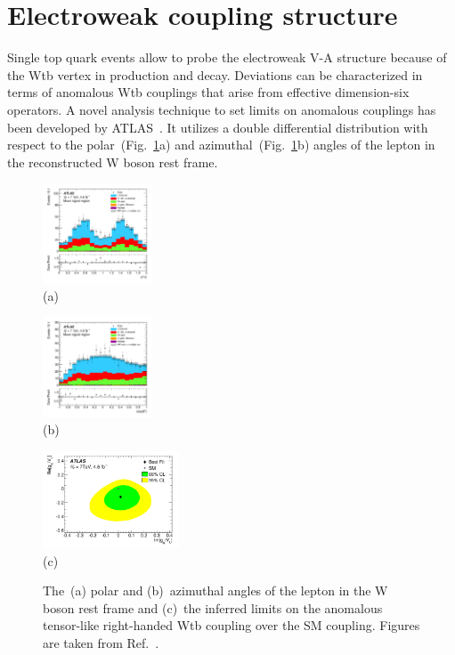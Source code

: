 \documentclass{PoS}
\begin{document}
\section{Electroweak coupling structure}
Single top quark events allow to probe the electroweak V-A structure because of the Wtb vertex in production and decay. Deviations can be characterized in terms of anomalous Wtb couplings that arise from effective dimension-six operators. A novel analysis technique to set limits on anomalous couplings has been developed by ATLAS~\cite{atlas-anomcoupl}. It utilizes a double differential distribution with respect to the polar~(Fig.~\ref{fig:angles}a) and azimuthal~(Fig.~\ref{fig:angles}b) angles of the lepton in the reconstructed W boson rest frame.

\begin{figure}[htbp]
\begin{center}
\parbox[t]{0.3\textwidth}{\centering\includegraphics[width=0.29\textwidth]{atlas_anomcoupl/phi.pdf}\\(a)}
\parbox[t]{0.3\textwidth}{\centering\includegraphics[width=0.29\textwidth]{atlas_anomcoupl/theta.pdf}\\(b)}
\parbox[t]{0.38\textwidth}{\centering\includegraphics[width=0.36\textwidth]{atlas_anomcoupl/limits.pdf}\\(c)}
\end{center}
\caption{\label{fig:angles}The~(a) polar and (b)~azimuthal angles of the lepton in the W boson rest frame and (c)~the inferred limits on the anomalous tensor-like right-handed Wtb coupling over the SM coupling. Figures are taken from Ref.~\cite{atlas-anomcoupl}.}
\end{figure}
\end{document}
